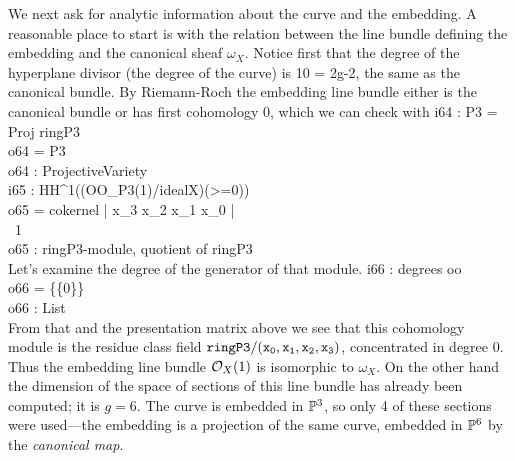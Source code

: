We next ask for
analytic information about the curve and the embedding.
A reasonable place to start is
with the relation between the line bundle defining the
embedding and the canonical sheaf $\omega_X$.
Notice first that the degree of the hyperplane divisor (the
degree of the curve) is 10 = 2g-2, the same as the canonical
bundle. By Riemann-Roch the embedding line bundle either is the canonical
bundle or has first cohomology 0, which we can check with
\beginOutput
i64 : P3 = Proj ringP3\\
\emptyLine
o64 = P3\\
\emptyLine
o64 : ProjectiveVariety\\
\endOutput
\beginOutput
i65 : HH^1((OO_P3(1)/idealX)(>=0))\\
\emptyLine
o65 = cokernel | x_3 x_2 x_1 x_0 |\\
\emptyLine
\                                       1\\
o65 : ringP3-module, quotient of ringP3\\
\endOutput
Let's examine the degree of the generator of that module.
\beginOutput
i66 : degrees oo\\
\emptyLine
o66 = \{\{0\}\}\\
\emptyLine
o66 : List\\
\endOutput
From that and the presentation matrix above
we see that this cohomology module is the residue class field
${\tt ringP3/(x_0,x_1,x_2,x_3)}$,
concentrated in degree 0.
Thus the embedding line bundle $\cO_X(1)$
is isomorphic to $\omega_X$. On the other hand
the dimension of the space of sections of this line bundle has already been
computed; it is $g = 6$. The curve is embedded in $\P^3$, so
only 4 of these sections were used---the embedding is a projection
of the same curve,  embedded in  $\P^6$ by the {\it canonical map\/}.


